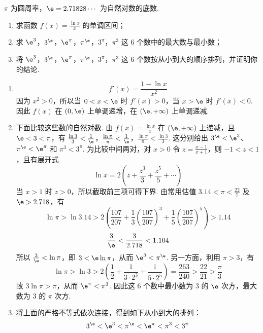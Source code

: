 \begin{problem}
\(\pi\) 为圆周率，\(\e = 2.71828\cdots\) 为自然对数的底数.
\begin{enumerate}
\item 求函数 \( f(x) = \frac{\ln x}{x} \) 的单调区间；
\item 求 \( \e^{3} \)，\( 3^{\e} \)，\( \e^{\pi} \)，\( \pi^{\e} \)，\( 3^{\pi} \)，\( \pi^{3} \) 这 6 个数中的最大数与最小数；
\item 将 \( \e^{3} \)，\( 3^{\e} \)，\( \e^{\pi} \)，\( \pi^{\e} \)，\( 3^{\pi} \)，\( \pi^{3} \) 这 6 个数按从小到大的顺序排列，并证明你的结论.
\end{enumerate}
\end{problem}

\begin{solution}
\begin{enumerate}
\item
\[
f'(x)=\frac{1-\ln x}{x^2}
\]
因为 \(x^2>0\)，所以当 \(0<x<\e\) 时 \(f'(x)>0\)，当 \(x>\e\) 时 \(f'(x)<0\). 因此 \(f(x)\) 在 \((0,\e)\) 上单调递增，在 \((\e,+\infty)\) 上单调递减.
\item 下面比较这些数的自然对数. 由 \(f(x)=\frac{\ln x}{x}\) 在 \((\e,+\infty)\) 上递减，且 \(\e<3<\pi\)，有
 \(\frac{\ln 3}{3}<\frac{1}{\e}\)，\(\frac{\ln \pi}{\pi}<\frac{1}{\e}\)，\(\frac{\ln \pi}{\pi}<\frac{\ln 3}{3}\).
这分别给出 \(3^{\e}<\e^{3}\)、\(\pi^{\e}<\e^{\pi}\) 和 \(\pi^{3}<3^{\pi}\). 为比较中间两对，对 \(x>0\) 令 \(z=\frac{x-1}{x+1}\)，则 \(-1<z<1\)，且有展开式
\[
\ln x=2\left(z+\frac{z^3}{3}+\frac{z^5}{5}+\cdots\right)
\]
当 \(x>1\) 时 \(z>0\)，所以截取前三项可得下界.
由常用估值 \(3.14<\pi<\frac{22}{7}\) 及 \(\e>2.718\)，有
\[
\ln\pi>\ln 3.14>2\left(\frac{107}{207}+\frac{1}{3}\left(\frac{107}{207}\right)^3+\frac{1}{5}\left(\frac{107}{207}\right)^5\right)>1.14
\]
\[
\frac{3}{\e}<\frac{3}{2.718}<1.104
\]
所以 \(\frac{3}{\e}<\ln\pi\)，即 \(3<\e\ln\pi\)，从而 \(\e^{3}<\pi^{\e}\). 另一方面，利用 \(\pi>3\)，有
\[
\ln\pi>\ln3>2\left(\frac12+\frac{1}{3\cdot2^3}+\frac{1}{5\cdot2^5}\right)=\frac{263}{240}>\frac{22}{21}>\frac{\pi}{3}
\]
故 \(3\ln\pi>\pi\)，从而 \(\e^{\pi}<\pi^{3}\).
因此这 6 个数中最小数为 \(3\) 的 \(\e\) 次方，最大数为 \(3\) 的 \(\pi\) 次方.

\item 将上面的严格不等式依次连接，得到如下从小到大的排列：
\[
3^{\e}<\e^{3}<\pi^{\e}<\e^{\pi}<\pi^{3}<3^{\pi}
\]
\end{enumerate}
\end{solution}
